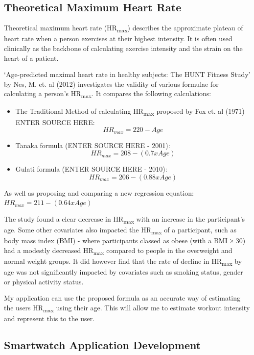 \documentclass{l4proj}
\begin{document}
\subsection{Theoretical Maximum Heart Rate}

Theoretical maximum heart rate (HR\textsubscript{max}) describes the approximate plateau of heart rate when a person exercises at their highest intensity. It is often used clinically as the backbone of calculating exercise intensity and the strain on the heart of a patient. 

‘Age-predicted maximal heart rate in healthy subjects: The HUNT Fitness Study’ by Nes, M. et. al (2012) investigates the validity of various formulae for calculating a person’s HR\textsubscript{max}. It compares the following calculations:

\begin{itemize}
    \item The Traditional Method of calculating HR\textsubscript{max} proposed by Fox et. al (1971) ENTER SOURCE HERE: $$HR_{max} = 220 - Age$$
    \item Tanaka formula (ENTER SOURCE HERE - 2001): $$HR_{max} = 208 - (0.7 x Age)$$
    \item Gulati formula (ENTER SOURCE HERE - 2010): $$HR_{max} = 206 - (0.88 x Age)$$
\end{itemize}

As well as proposing and comparing a new regression equation: $HR_{max} = 211 - (0.64 x Age)$

The study found a clear decrease in HR\textsubscript{max} with an increase in the participant’s age. Some other covariates also impacted the HR\textsubscript{max} of a participant, such as body mass index (BMI) - where participants classed as obese (with a BMI ≥ 30) had a modestly decreased HR\textsubscript{max} compared to people in the overweight and normal weight groups. It did however find that the rate of decline in HR\textsubscript{max} by age was not significantly impacted by covariates such as smoking status, gender or physical activity status.

My application can use the proposed formula as an accurate way of estimating the users HR\textsubscript{max} using their age. This will allow me to estimate workout intensity and represent this to the user.


\subsection{Smartwatch Application Development}
\end{document}

